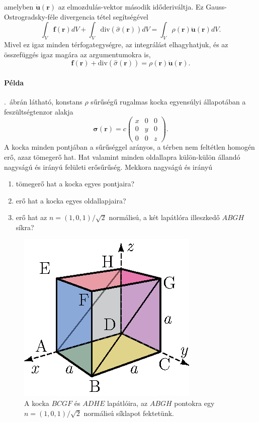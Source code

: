 \documentclass[12pt,a4paper]{scrartcl}
\let\mathbf\bm
\begin{document}
amelyben ${\mathbf{\ddot u\left({\mathbf{r}}\right)}}$ az elmozdulás-vektor második időderiváltja. Ez Gauss-Ostrogradsky-féle divergencia tétel segítségével
\[\int_V {{\mathbf{f}}\left( {\mathbf{r}} \right)dV}  + \int_V {{\text{div}}\left( {\hat \sigma \left( {\mathbf{r}} \right)} \right)dV}  = \int_V {\rho \left( {\mathbf{r}} \right){\mathbf{\ddot u\left({\mathbf{r}}\right)}}dV} .\]
Mivel ez igaz minden térfogategységre, az integrálást elhagyhatjuk, és az összefüggés igaz magára az argumentumokra is,
\begin{equation}
{\mathbf{f}}\left( {\mathbf{r}} \right) + {\text{div}}\left( {\hat \sigma \left( {\mathbf{r}} \right)} \right) = \rho \left( {\mathbf{r}} \right){\mathbf{\ddot u\left({\mathbf{r}}\right)}}.
\end{equation}

\footnotesize
\paragraph{Példa}
.\ ábrán látható, konstans $\rho$ sűrűségű rugalmas kocka egyensúlyi állapotában a feszültségtenzor alakja 
\[{\mathbf{\sigma }}\left( {\mathbf{r}} \right) = c \left( {\begin{array}{*{20}{c}}
  {{x}}&0&0 \\ 
  0&{{y}}&0 \\ 
  0&0&{{z}} 
\end{array}} \right).\]
A kocka minden pontjában a sűrűséggel arányos, a térben nem feltétlen homogén erő, azaz tömegerő hat. Hat valamint minden oldallapra külön-külön állandó nagyságú és irányú felületi erősűrűség. Mekkora nagyságú és irányú
\begin{enumerate}
\item tömegerő hat a kocka egyes pontjaira?
\item erő hat a kocka egyes oldallapjaira?
\item erő hat az $n = \left( {1,0,1} \right)/\sqrt 2 $ normálisú, a két lapátlóra illeszkedő $ABGH$ síkra?
\end{enumerate}
\begin{figure}[htb] 
\centering    
\includegraphics[scale=1]{figs/kocka_atloval.eps}
\caption{A kocka $BCGF$ és $ADHE$ lapátlóira, az $ABGH$ pontokra egy $n = \left( {1,0,1} \right)/\sqrt 2 $ normálisú síklapot fektetünk. }
\label{fig:kocka_atloval}
\end{figure}
\FloatBarrier
\end{document}
